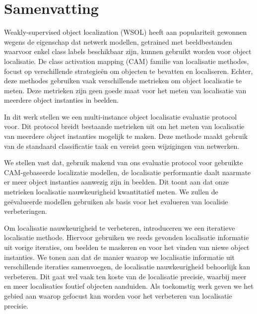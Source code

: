\chapter*{Samenvatting}

Weakly-supervised object localization (WSOL) heeft aan populariteit gewonnen wegens de eigenschap dat netwerk modellen, getrained met beeldbestanden waarvoor enkel class labels beschikbaar zijn, kunnen gebruikt worden voor object localisatie. De class activation mapping (CAM) familie van localisatie methodes, focust op verschillende strategieën om objecten te bevatten en localiseren. Echter, deze methodes gebruiken vaak verschillende metrieken om object localisatie te meten. Deze metrieken zijn geen goede maat voor het meten van localisatie van  meerdere object instanties in beelden.

In dit werk stellen we een multi-instance object localisatie evaluatie protocol voor. Dit protocol breidt bestaande metrieken uit om het meten van localisatie van meerdere object instanties mogelijk te maken. Deze methode maakt gebruik van de standaard classificatie taak en vereist geen wijzigingen van netwerken.

We stellen vast dat, gebruik makend van ons evaluatie protocol voor gebruikte CAM-gebaseerde localizatie modellen, de localisatie performantie daalt naarmate er meer object instanties aanwezig zijn in beelden. Dit toont aan dat onze metrieken localisatie nauwkeurigheid kwantitatief meten. We zullen de geëvalueerde modellen gebruiken als basis voor het evalueren van localisie verbeteringen.

Om localisatie nauwkeurigheid te verbeteren, introduceren we een iteratieve localisatie methode. Hiervoor gebruiken we reeds gevonden localisatie informatie uit vorige iteraties, om beelden te maskeren en voor het vinden van niewe object instanties. We tonen aan dat de manier waarop we localisatie informatie uit verschillende iteraties samenvoegen, de localisatie nauwkeurigheid behoorlijk kan verbeteren. Dit gaat wel vaak ten koste van de localisatie precisie, waarbij meer en meer localisaties foutief objecten aanduiden. Als toekomstig werk geven we het gebied aan waarop gefocust kan worden voor het verbeteren van localisatie precisie.
